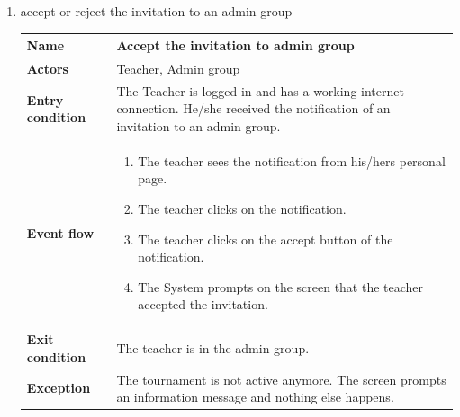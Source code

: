 \documentclass{article}
\begin{document}
\begin{enumerate}[label=\textbf{UC\arabic*}:]
        \item accept or reject the invitation to an admin group
            \begin{center}
            \begin{tabular}{ | m{8em} | m{10cm}|  } 
            \hline 
            \textbf{Name} & Accept the invitation to admin group\\[1ex] 
            \hline 
            \textbf{Actors} & Teacher, Admin group\\[1ex] 
            \hline 
            \textbf{Entry condition} & The Teacher is logged in and has a working internet connection. He/she received the notification of an invitation to an admin group. \\[1ex] 
            \hline 
            \textbf{Event flow} & \begin{enumerate}[label=\textbf{\arabic*}:]
                \item The teacher sees the notification from his/hers personal page.
                \item The teacher clicks on the notification.
                \item The teacher clicks on the accept button of the notification.
                \item The System prompts on the screen that the teacher accepted the invitation. 
            \end{enumerate} \\[1ex]
            \hline 
            \textbf{Exit condition} & The teacher is in the admin group.\\[1ex]
            \hline
            \textbf{Exception} & The tournament is not active anymore. The screen prompts an information message and nothing else happens.\\[1ex]
            \hline 
            \end{tabular}
            \end{center}




\end{enumerate}
\end{document}

